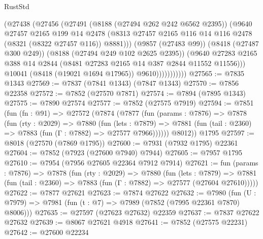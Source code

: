 \begin{lexlean}{RustStd}
\begin{coremodule}
                        (@27438
                          (@27456
                            (@27491
                              (@8188 (@27494 @262 @242 @6562 @2395))
                              (@9640
                                @27457
                                @2165
                                @199
                                @14
                                @2478
                                (@8313
                                  @27457
                                  @2165
                                  @116
                                  @14
                                  @116
                                  @2478
                                  (@8321 (@8322 @27457 @116))
                                  @8881)))
                            (@9857 (@27483 @99))
                            (@8418 (@27487 @300 @249))
                            (@8188 (@27494 @249 @102 @2625 @2395))
                            (@9640
                              @27283
                              @2165
                              @388
                              @14
                              @2844
                              (@8481 @27283 @2165 @14 @387 @2844 @11552 @11556)))
                          @10041
                          (@8418 (@19021 @1694 @17965))
                          @9610)))))))))))
@27565 := @7835 @1343
@27569 := @7837 (@7841 @1343) (@7847 @1343)
@27570 := @7856 @22358
@27572 := @7852 (@27570 @7871)
@27574 := @7894 (@7895 @1343)
@27575 := @7890 @27574
@27577 := @7852 (@27575 @7919)
@27594 := @7851
    (fun (fn : @91) =>
    @27572
      (@7874
        (@7877
          (fun (params : @7876) =>
          @7878
            (fun (rty : @2029) =>
            @7880
              (fun (lets : @7879) =>
              @7881 (fun (tail : @2360) => @7883 (fun (Γ : @7882) => @27577 @7966))))))
        @8012))
    @1795
@27597 := @8018 (@27570 (@7869 @1795))
@27600 := @7931 (@7932 @1795) @22361
@27604 := @7852 (@7923 (@27600 @7940) @7944)
@27605 := @7957 @1795
@27610 := @7954 (@7956 @27605 @22364 @7912 @7914)
@27621 := fun (params : @7876) =>
  @7878
    (fun (rty : @2029) =>
    @7880
      (fun (lets : @7879) =>
      @7881 (fun (tail : @2360) => @7883 (fun (Γ : @7882) => @27577 (@27604 @27610)))))
@27622 := @7877 @27621
@27623 := @7874 @27622
@27632 := @7980
    (fun (U : @7979) => @7981 (fun (t : @7) => @7989 (@7852 (@7995 @22361 @7870) @8006)))
@27635 := @27597 (@27623 @27632) @22359
@27637 := @7837 @27622 @27632
@27639 := @8067 @27621 @4918
@27641 := @7852 (@27575 @22231)
@27642 := @27600 @22234

\end{coremodule}
\end{lexlean}
